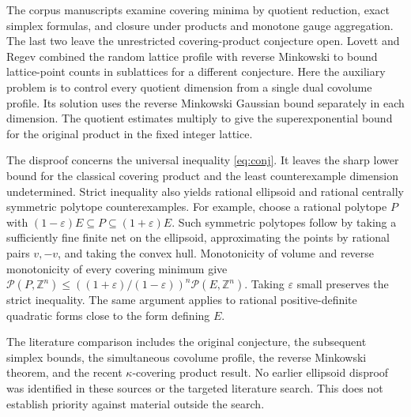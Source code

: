 \documentclass[11pt]{article}
\newcommand{\Z}{\mathbb Z}
\newcommand{\Pcov}{\mathcal P}
\begin{document}
The corpus manuscripts \cite{VMRC200,VMRC221,VMRC225} examine
covering minima by quotient reduction, exact simplex formulas, and
closure under products and monotone gauge aggregation.
The last two leave the unrestricted covering-product conjecture open.
Lovett and Regev \cite{LovettRegev} combined the random lattice profile
with reverse Minkowski to bound lattice-point counts in sublattices
for a different conjecture. Here the auxiliary problem is to control every quotient dimension
from a single dual covolume profile. Its solution uses the
reverse Minkowski Gaussian bound separately in each dimension.
The quotient estimates multiply to give the superexponential
bound for the original product in the fixed integer lattice.

The disproof concerns the universal inequality \eqref{eq:conj}.
It leaves the sharp lower bound for the classical covering product
and the least counterexample dimension undetermined.
Strict inequality also yields rational ellipsoid and rational
centrally symmetric polytope counterexamples. For example, choose
a rational polytope \(P\) with \((1-\varepsilon)E\subseteq P
\subseteq(1+\varepsilon)E\). Such symmetric polytopes follow by
taking a sufficiently fine finite net on the ellipsoid, approximating
the points by rational pairs \(v,-v\), and taking the convex hull.
Monotonicity of volume and reverse monotonicity of every covering
minimum give
\(\Pcov(P,\Z^n)\le((1+\varepsilon)/(1-\varepsilon))^n\Pcov(E,\Z^n)\).
Taking \(\varepsilon\) small preserves the strict inequality.
The same argument applies to rational positive-definite quadratic
forms close to the form defining \(E\).

The literature comparison includes the original conjecture, the
subsequent simplex bounds, the simultaneous covolume profile, the
reverse Minkowski theorem, and the recent \(\kappa\)-covering
product result. No earlier ellipsoid disproof was identified in
these sources or the targeted literature search. This does not
establish priority against material outside the search.
\end{document}
